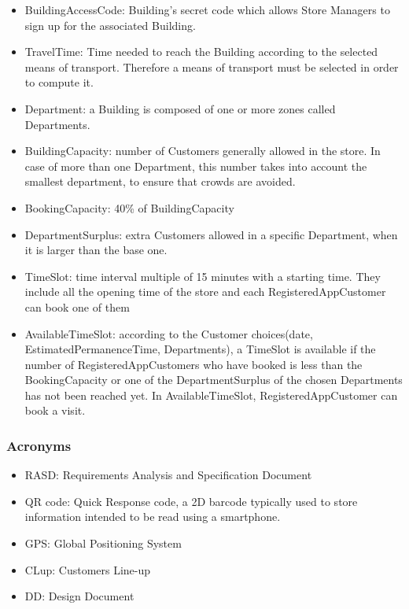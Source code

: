 \documentclass{article}
\begin{document}
\begin{itemize}
			\item \textcolor{BrickRed}{BuildingAccessCode}: Building’s secret code which allows Store Managers to sign up for the associated Building.
			\item \textcolor{BrickRed}{TravelTime}: Time needed to reach the Building according to the selected means of transport. Therefore a means of transport must be selected in order to compute it.
			\item \textcolor{BrickRed}{Department}: a Building is composed of one or more zones called Departments.
			\item \textcolor{BrickRed}{BuildingCapacity}: number of Customers generally allowed in the store. In case of more than one Department, this number takes into account the smallest department, to ensure that crowds are avoided.
			\item \textcolor{BrickRed}{BookingCapacity}:  40\% of BuildingCapacity 
			\item \textcolor{BrickRed}{DepartmentSurplus}: extra Customers allowed in a specific Department, when it is larger than the base one.
			\item \textcolor{BrickRed}{TimeSlot}: time interval multiple of 15 minutes with a starting time. They include all the opening time of the store and each RegisteredAppCustomer can book one of them
			\item \textcolor{BrickRed}{AvailableTimeSlot}: according to the Customer choices(date, EstimatedPermanenceTime, Departments), a TimeSlot is available if the number of RegisteredAppCustomers who have booked is less than the BookingCapacity or one of the DepartmentSurplus of the chosen Departments has not been reached yet. In AvailableTimeSlot, RegisteredAppCustomer can book a visit.
		\end{itemize}
		
		\subsubsection{Acronyms}
		\begin{itemize}
			\item \textcolor{BrickRed}{RASD}: Requirements Analysis and Specification Document 
			\item \textcolor{BrickRed}{QR code}: Quick Response code, a 2D barcode typically used to store information intended to be read using a smartphone.
			\item \textcolor{BrickRed}{GPS}: Global Positioning System
			\item \textcolor{BrickRed}{CLup}: Customers Line-up
			\item \textcolor{BrickRed}{DD}: Design Document 
		\end{itemize}
		
\end{document}

